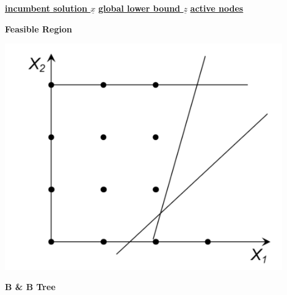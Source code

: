 \documentclass[11pt]{article}
\theoremstyle{definition}
\begin{document}
\underline{\textbf{incumbent solution $\underline{x}$}}
\hspace{2cm}
\underline{\textbf{global lower bound $\underline{z}$}}
\hspace{2cm}
\underline{\textbf{active nodes}}



\newpage

\textbf{Feasible Region}

\begin{center}
\includegraphics[width=0.9\textwidth]{B&BFeasibleRegion.png}
\end{center}

\newpage
\textbf{B \& B Tree}
\newpage

\hspace{3cm}
\end{document}
